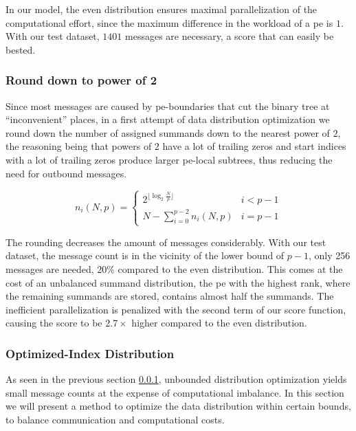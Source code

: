 In our model, the even distribution ensures maximal parallelization of the computational effort, since the maximum difference in the workload of a
\gls{pe} is $1$. With our test dataset, $1401$ messages are necessary, a score that can easily be bested.

\subsubsection{Round down to power of 2}
\label{sec:roundDownPower2Distribution}
Since most messages are caused by \gls{pe}-boundaries that cut the binary tree at \enquote{inconvenient} places, in a first attempt of data distribution
optimization we round down the number of assigned summands down to the nearest power of $2$,
the reasoning being that powers of $2$ have a lot of trailing
zeros and start indices with a lot of trailing zeros produce larger \gls{pe}-local subtrees, thus reducing the need for outbound messages.

\begin{equation}
\label{eq:roundDownPower2Distribution}
n_i (N, p) = \begin{cases}
2^{\lfloor \log_2 \frac{N}{p} \rfloor} & i < p - 1\\
N - \sum_{i=0}^{p-2} n_i (N,p) & i = p - 1
\end{cases}
\end{equation}

The rounding decreases the amount of messages considerably. With our test dataset, the message count is in the vicinity of the lower bound of $p - 1$, only
256 messages are needed, $20\%$ compared to the even distribution. This comes at the cost of an unbalanced summand distribution, the \gls{pe}
with the highest rank, where the remaining summands are stored, contains almost half the summands.
The inefficient parallelization is penalized with the second term of our score function, causing the score to be $2.7\times$ higher compared to
the even distribution.

\subsubsection{Optimized-Index Distribution}
As seen in the previous section \ref{sec:roundDownPower2Distribution}, unbounded distribution optimization yields small message counts at the expense
of computational imbalance. In this section we will present a method to optimize the data distribution within certain bounds, to balance communication
and computational costs.

